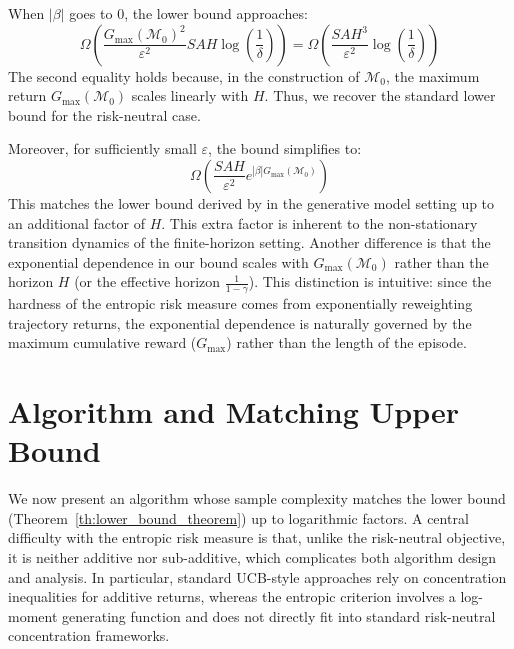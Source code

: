 \documentclass[final,12pt]{colt2026} %
\begin{document}
When $|\beta|$ goes to $0$, the lower bound approaches:$$\Omega\left( \frac{G_{\max}(\mathcal{M}_0)^2}{\varepsilon^2} SAH \log \left( \frac{1}{\delta} \right)\right) = \Omega\left( \frac{SAH^3}{\varepsilon^2} \log \left( \frac{1}{\delta} \right)\right)$$
The second equality holds because, in the construction of $\mathcal{M}_0$, the maximum return $G_{\max}(\mathcal{M}_0)$ scales linearly with $H$. Thus, we recover the standard lower bound for the risk-neutral case. 

Moreover, for sufficiently small $\varepsilon$, the bound simplifies to:
$$\Omega \left( \frac{SAH}{\varepsilon^2} e^{|\beta|G_{\max}(\mathcal{M}_0)}\right)$$
This matches the lower bound derived by \citep{MortensenTalebi2025} in the generative model setting up to an additional factor of $H$. This extra factor is inherent to the non-stationary transition dynamics of the finite-horizon setting. Another difference is that the exponential dependence in our bound scales with $G_{\max}(\mathcal{M}_0)$ rather than the horizon $H$ (or the effective horizon $\frac{1}{1-\gamma}$). This distinction is intuitive: since the hardness of the entropic risk measure comes from exponentially reweighting trajectory returns, the exponential dependence is naturally governed by the maximum cumulative reward ($G_{\max}$) rather than the length of the episode.\label{explainGmaxlower}


\section{Algorithm and Matching Upper Bound}
\label{sec:algorithm}





We now present an algorithm whose sample complexity matches the lower bound (Theorem~\ref{th:lower_bound_theorem}) up to logarithmic factors. A central difficulty with the entropic risk measure is that, unlike the risk-neutral objective, it is neither additive nor sub-additive, which complicates both algorithm design and analysis. In particular, standard UCB-style approaches rely on concentration inequalities for additive returns, whereas the entropic criterion involves a log-moment generating function and does not directly fit into standard risk-neutral concentration frameworks.
\end{document}
